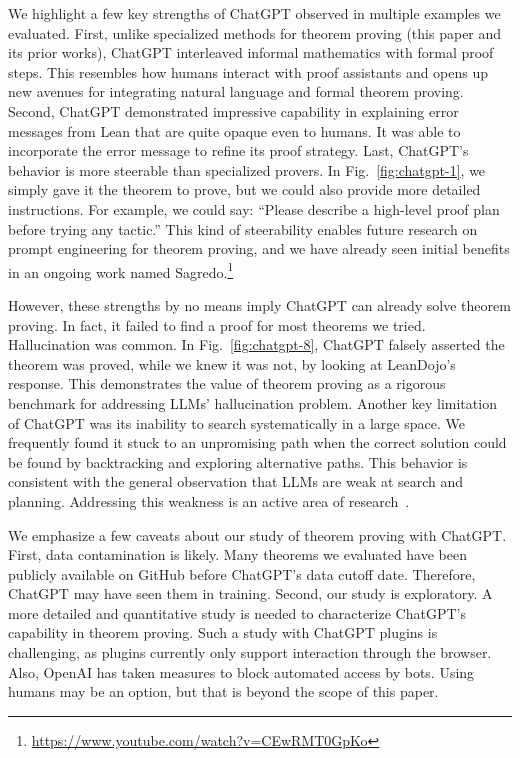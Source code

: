 \documentclass{article}
\begin{document}
We highlight a few key strengths of ChatGPT observed in multiple examples we evaluated. First, unlike specialized methods for theorem proving (this paper and its prior works), ChatGPT interleaved informal mathematics with formal proof steps. This resembles how humans interact with proof assistants and opens up new avenues for integrating natural language and formal theorem proving. Second, ChatGPT demonstrated impressive capability in explaining error messages from Lean that are quite opaque even to humans. It was able to incorporate the error message to refine its proof strategy. Last, ChatGPT's behavior is more steerable than specialized provers. In Fig.~\ref{fig:chatgpt-1}, we simply gave it the theorem to prove, but we could also provide more detailed instructions. For example, we could say: ``Please describe a high-level proof plan before trying any tactic.'' This kind of steerability enables future research on prompt engineering for theorem proving, and we have already seen initial benefits in an ongoing work named Sagredo.\footnote{\url{https://www.youtube.com/watch?v=CEwRMT0GpKo}} 

However, these strengths by no means imply ChatGPT can already solve theorem proving. In fact, it failed to find a proof for most theorems we tried. Hallucination was common. In Fig.~\ref{fig:chatgpt-8}, ChatGPT falsely asserted the theorem was proved, while we knew it was not, by looking at LeanDojo's response. This demonstrates the value of theorem proving as a rigorous benchmark for addressing LLMs' hallucination problem. Another key limitation of ChatGPT was its inability to search systematically in a large space. We frequently found it stuck to an unpromising path when the correct solution could be found by backtracking and exploring alternative paths. This behavior is consistent with the general observation that LLMs are weak at search and planning. Addressing this weakness is an active area of research~\cite{yao2023tree}.

We emphasize a few caveats about our study of theorem proving with ChatGPT. First, data contamination is likely. Many theorems we evaluated have been publicly available on GitHub before ChatGPT's data cutoff date. Therefore, ChatGPT may have seen them in training. Second, our study is exploratory. A more detailed and quantitative study is needed to characterize ChatGPT's capability in theorem proving. Such a study with ChatGPT plugins is challenging, as plugins currently only support interaction through the browser. Also, OpenAI has taken measures to block automated access by bots. Using humans may be an option, but that is beyond the scope of this paper.
\end{document}
